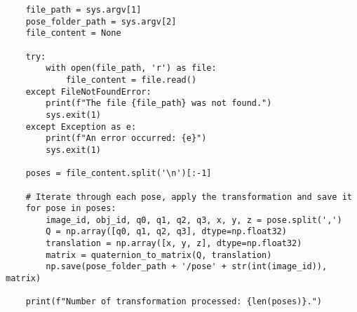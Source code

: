 \begin{lstlisting}
    file_path = sys.argv[1]
    pose_folder_path = sys.argv[2]
    file_content = None

    try:
        with open(file_path, 'r') as file:
            file_content = file.read()
    except FileNotFoundError:
        print(f"The file {file_path} was not found.")
        sys.exit(1)
    except Exception as e:
        print(f"An error occurred: {e}")
        sys.exit(1)

    poses = file_content.split('\n')[:-1]

    # Iterate through each pose, apply the transformation and save it
    for pose in poses:
        image_id, obj_id, q0, q1, q2, q3, x, y, z = pose.split(',')
        Q = np.array([q0, q1, q2, q3], dtype=np.float32)
        translation = np.array([x, y, z], dtype=np.float32)
        matrix = quaternion_to_matrix(Q, translation)
        np.save(pose_folder_path + '/pose' + str(int(image_id)), matrix)

    print(f"Number of transformation processed: {len(poses)}.")
\end{lstlisting}

\cleardoublepage{}

